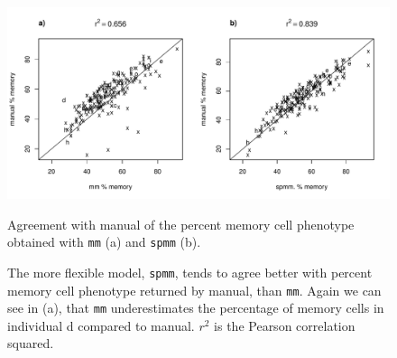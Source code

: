 \begin{figure}
\centering
\begin{minipage}{.7\textwidth}
\includegraphics[width=\linewidth]{figures/memory-auto-manual-agreement-weights.pdf}
\end{minipage}
{Agreement with manual of the percent memory cell phenotype obtained with \texttt{mm} (a) and \texttt{spmm} (b).}
{
  The more flexible model, \texttt{spmm}, tends to agree better with percent memory cell phenotype returned by manual, than \texttt{mm}.
  Again we can see in (a), that \texttt{mm} underestimates the percentage of memory cells in individual d compared to
  manual.  $r^2$ is the Pearson correlation squared.

}
\end{figure}

